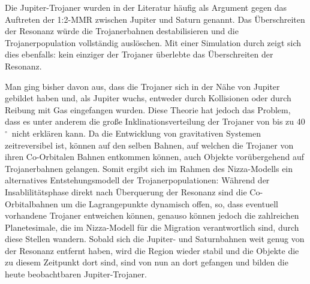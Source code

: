 \documentclass[12pt,a4paper,twoside]{article}
\renewcommand{\cite}{\citep}
\newcommand{\degree}{$^\circ$}
\begin{document}
Die Jupiter-Trojaner wurden in der Literatur häufig als Argument gegen das Auftreten der 1:2-MMR zwischen Jupiter und Saturn genannt. Das Überschreiten der Resonanz würde die Trojanerbahnen destabilisieren und die Trojanerpopulation vollständig auslöschen\cite{Gomes1998,Michtchenko2001,Morbidelli2005}.
Mit einer Simulation durch \cite{Morbidelli2005} zeigt sich dies ebenfalls: kein einziger der Trojaner überlebte das Überschreiten der Resonanz. %

Man ging bisher davon aus, dass die Trojaner sich in der Nähe von Jupiter gebildet haben und, als Jupiter wuchs, entweder durch Kollisionen oder durch Reibung mit Gas %
eingefangen wurden.
Diese Theorie hat jedoch das Problem, dass es unter anderem die große Inklinationsverteilung der Trojaner von bis zu 40\degree\ nicht erklären kann\cite{Marzari2002,Morbidelli2005}. %
Da die Entwicklung von gravitativen Systemen zeitreversibel ist, %
können auf den selben Bahnen, auf welchen die Trojaner von ihren Co-Orbitalen Bahnen entkommen können, auch Objekte vorübergehend auf Trojanerbahnen gelangen.
Somit ergibt sich im Rahmen des Nizza-Modells ein alternatives Entstehungsmodell der Trojanerpopulationen: Während der Insablilitätsphase direkt nach Überquerung der Resonanz sind die Co-Orbitalbahnen um die Lagrangepunkte dynamisch offen, so, dass eventuell vorhandene Trojaner entweichen können, genauso können jedoch die zahlreichen Planetesimale, die im Nizza-Modell für die Migration verantwortlich sind, durch diese Stellen wandern. %
Sobald sich die Jupiter- und Saturnbahnen weit genug von der Resonanz entfernt haben, wird die Region wieder stabil und die Objekte die zu diesem Zeitpunkt dort sind, sind von nun an dort gefangen und bilden die heute beobachtbaren Jupiter-Trojaner.
\end{document}
